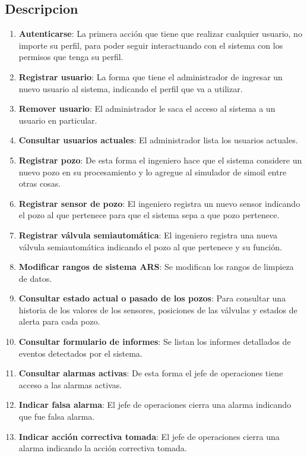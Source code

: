 \documentclass{article}
\theoremstyle{definition}
\theoremstyle{remark}
\begin{document}
\subsection{Descripcion}

\begin{enumerate}
    \item \textbf{Autenticarse}: La primera acción que tiene que realizar cualquier usuario, no importe su perfil, para poder seguir interactuando con el sistema con los permisos que tenga su perfil.
    \item \textbf{Registrar usuario}: La forma que tiene el administrador de ingresar un nuevo usuario al sistema, indicando el perfil que va a utilizar.
    \item \textbf{Remover usuario}: El administrador le saca el acceso al sistema a un usuario en particular.
    \item \textbf{Consultar usuarios actuales}: El administrador lista los usuarios actuales.
    \item \textbf{Registrar pozo}: De esta forma el ingeniero hace que el sistema considere un nuevo pozo en su procesamiento y lo agregue al simulador de simoil entre otras cosas.
    \item \textbf{Registrar sensor de pozo}: El ingeniero registra un nuevo sensor indicando el pozo al que pertenece para que el sistema sepa a que pozo pertenece.
    \item \textbf{Registrar válvula semiautomática}: El ingeniero registra una nueva válvula semiautomática indicando el pozo al que pertenece y su función.
    \item \textbf{Modificar rangos de sistema ARS}: Se modifican los rangos de limpieza de datos.
    \item \textbf{Consultar estado actual o pasado de los pozos}: Para consultar una historia de los valores de los sensores, posiciones de las válvulas y estados de alerta para cada pozo.
    \item \textbf{Consultar formulario de informes}: Se listan los informes detallados de eventos detectados por el sistema.
    \item \textbf{Consultar alarmas activas}: De esta forma el jefe de operaciones tiene acceso a las alarmas activas.
    \item \textbf{Indicar falsa alarma}: El jefe de operaciones cierra una alarma indicando que fue falsa alarma.
    \item \textbf{Indicar acción correctiva tomada}: El jefe de operaciones cierra una alarma indicando la acción correctiva tomada.
\end{enumerate}
\end{document}
